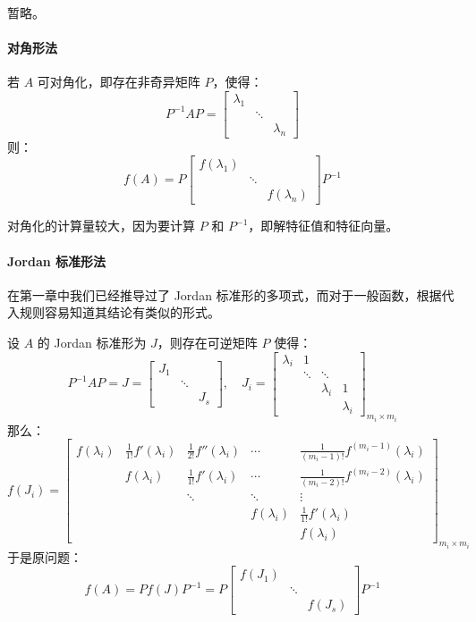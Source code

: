 暂略。



\paragraph{对角形法}

若 $A$ 可对角化，即存在非奇异矩阵 $P$，使得：
\[
    P^{-1}AP=\begin{bmatrix}\lambda_1&&\\&\ddots&\\&&\lambda_n\end{bmatrix}
\]
则：
\[
    f(A)=P\begin{bmatrix}f(\lambda_1)&&\\&\ddots&\\&&f(\lambda_n)\end{bmatrix}P^{-1}
\]

\begin{note}
对角化的计算量较大，因为要计算 $P$ 和 $P^{-1}$，即解特征值和特征向量。
\end{note}


\paragraph{Jordan 标准形法}

在第一章中我们已经推导过了 Jordan 标准形的多项式，而对于一般函数，根据代入规则容易知道其结论有类似的形式。

设 $A$ 的 Jordan 标准形为 $J$，则存在可逆矩阵 $P$ 使得：
\[
    P^{-1}AP=J=\begin{bmatrix}J_1&&\\&\ddots&\\&&J_s\end{bmatrix},\quad J_i=\begin{bmatrix}\lambda_i&1&&\\&\ddots&\ddots&\\&&\lambda_i&1\\&&&\lambda_i\end{bmatrix}_{m_i\times m_i}
\]
那么：
\[
    f(J_i)=\begin{bmatrix}
    f(\lambda_i)&\frac{1}{1!}f'(\lambda_i)&\frac{1}{2!}f''(\lambda_i)&\cdots&\frac{1}{(m_i-1)!}f^{(m_i-1)}(\lambda_i)\\
    &f(\lambda_i)&\frac{1}{1!}f'(\lambda_i)&\cdots&\frac{1}{(m_i-2)!}f^{(m_i-2)}(\lambda_i)\\
    &&\ddots&\ddots&\vdots\\
    &&&f(\lambda_i)&\frac{1}{1!}f'(\lambda_i)\\
    &&&&f(\lambda_i)
    \end{bmatrix}_{m_i\times m_i}
\]
于是原问题：
\[
    f(A)=Pf(J)P^{-1}=P\begin{bmatrix}f(J_1)&&\\&\ddots&\\&&f(J_s)\end{bmatrix}P^{-1}
\]


